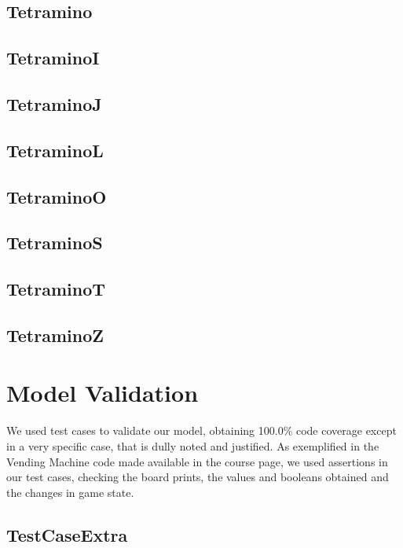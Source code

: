 \documentclass[a4paper]{article}
\begin{document}
\subsection{Tetramino}

\subsection{TetraminoI}

\subsection{TetraminoJ}

\subsection{TetraminoL}

\subsection{TetraminoO}

\subsection{TetraminoS}

\subsection{TetraminoT}

\subsection{TetraminoZ}


\section{Model Validation}

We used test cases to validate our model, obtaining 100.0\% code coverage except in a very specific case, that is dully noted and justified. As exemplified in the Vending Machine code made available in the course page, we used assertions in our test cases, checking the board prints, the values and booleans obtained and the changes in game state.

\subsection{TestCaseExtra}

\end{document}
